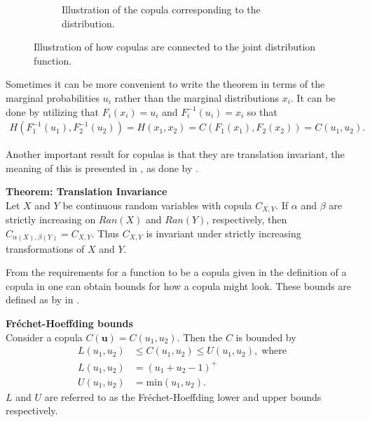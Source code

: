 \begin{figure}
\begin{subfigure}[t]{0.45\linewidth}
        \caption{Illustration of the copula corresponding to the distribution.}
    \end{subfigure}
    \caption{Illustration of how copulas are connected to the joint distribution function.}
    \label{fig:CDFtoCopula}
\end{figure}


Sometimes it can be more convenient to write the  theorem in terms of the marginal probabilities $u_i$ rather than the marginal distributions $x_i$. It can be done by utilizing that $F_i(x_i) = u_i$ and $F_i^{-1}(u_i)= x_i$ so that 
\begin{align*}
    H(F_1^{-1}(u_1),F_2^{-1}(u_2))=H(x_1,x_2) = C(F_1(x_1), F_2(x_2))= C(u_1, u_2).
\end{align*}

Another important result for copulas is that they are translation invariant, the meaning of this is presented in , as done by \citet[p.~25]{Nelsen2006}.

\begin{theorem}\label{the:TranslationInvariance}
        \textbf{Theorem: Translation Invariance}\\
        Let $X$ and $Y$ be continuous random variables with copula $C_{X, Y}$. If $\alpha$ and $\beta$ are strictly increasing on $Ran(X)$ and $Ran(Y)$, respectively, then $C_{\alpha(X),\beta(Y)}  = C_{X,Y}$. Thus $C_{X, Y}$ is invariant under strictly increasing transformations of $X$ and $Y$.
\end{theorem}

From the requirements for a function to be a copula given in the definition of a copula in  one can obtain bounds for how a copula might look. These bounds are defined as by  in .
    
\begin{theorem}\label{thm:FrechetBounds}
    \textbf{Fréchet-Hoeffding bounds} \\
    Consider a copula $C(\mathbf{u}) = C(u_1,u_2)$. Then the $C$ is bounded by
    \begin{align*}
        L(u_1,u_2) &\leq C(u_1,u_2) \leq U(u_1,u_2),\; \mathrm{ where}\\
        L(u_1,u_2) &= (u_1+u_2-1)^+\\
        U(u_1,u_2) &= \mathrm{min}(u_1,u_2).
    \end{align*}
    $L$ and $U$ are referred to as the Fréchet-Hoeffding lower and upper bounds respectively. 
\end{theorem}

